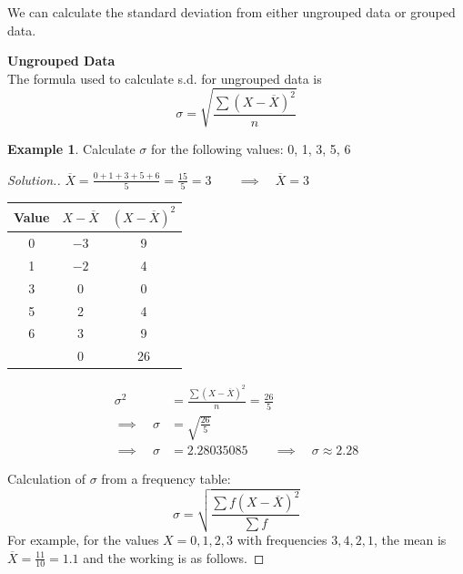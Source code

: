\documentclass[11pt,a4paper]{article}
\theoremstyle{definition}
\newtheorem{example}[thm]{Example}
\newenvironment{solution}
  {\renewcommand{\qedsymbol}{}\begin{proof}[\textit{Solution}.]}
  {\end{proof}}
\begin{document}
We can calculate the standard deviation from either ungrouped data or grouped data.\\



\begin{enumerate}
\item \textbf{Ungrouped Data}\\
The formula used to calculate s.d. for ungrouped data is \[\sigma =\sqrt{\frac{\sum (X-\overline{X})^2}{n}}\]

\begin{example}
Calculate $\sigma$ for the following values: 0, 1, 3, 5, 6\\[1ex]
\end{example}



\begin{solution}

$\overline{X}=\frac{0+1+3+5+6}{5}=\frac{15}{5}=3\qquad \implies\quad  \overline{X}=3$\\

\begin{table}[H]
\centering
\begin{tabular}{|c|c|c|}
\hline Value & $X-\overline{X}$ & $(X-\overline{X})^2$\\
\hline 0& $-3$ &9\\
1 & $-2$ & 4\\ 3&0&0\\ 5&2&4\\ 6&3&9\\
\hline &0&26\\
\hline
\end{tabular}
\end{table}

\begin{align*}
\sigma^2 &=\frac{\sum (X-\overline{X})^2}{n}=\frac{26}{5}\\[1ex]
\implies\quad  \sigma &= \sqrt{\frac{26}{5}}\\[1ex]
\implies\quad \sigma & =2.28035085\qquad  \implies\quad  \sigma \approx 2.28
\end{align*}

\item Calculation of $\sigma$ from a frequency table: \[\sigma=\sqrt{\frac{\sum f(X-\overline{X})^2}{\sum f}}\] For example, for the values $X = 0, 1, 2, 3$ with frequencies $3, 4, 2, 1$, the mean is $\overline{X} = \frac{11}{10} = 1.1$ and the working is as follows.
\end{solution}








\end{enumerate}
\end{document}
